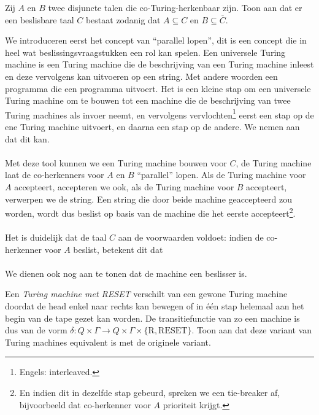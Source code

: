 \documentclass[a4paper]{article}
\begin{document}
\begin{question}
Zij $A$ en $B$ twee disjuncte talen die co-Turing-herkenbaar zijn. Toon aan dat er een beslisbare taal $C$ bestaat zodanig dat $A \subseteq C$ en $B \subseteq \overline{C}$.
\begin{answer}
We introduceren eerst het concept van ``parallel lopen'', dit is een concept die in heel wat beslissingsvraagstukken een rol kan spelen. Een universele Turing machine is een Turing machine die de beschrijving van een Turing machine inleest en deze vervolgens kan uitvoeren op een string. Met andere woorden een programma die een programma uitvoert. Het is een kleine stap om een universele Turing machine om te bouwen tot een machine die de beschrijving van twee Turing machines als invoer neemt, en vervolgens vervlochten\footnote{Engels: interleaved.} eerst een stap op de ene Turing machine uitvoert, en daarna een stap op de andere. We nemen aan dat dit kan.
\paragraph{}
Met deze tool kunnen we een Turing machine bouwen voor $C$, de Turing machine laat de co-herkenners voor $A$ en $B$ ``parallel'' lopen. Als de Turing machine voor $A$ accepteert, accepteren we ook, als de Turing machine voor $B$ accepteert, verwerpen we de string. Een string die door beide machine geaccepteerd zou worden, wordt dus beslist op basis van de machine die het eerste accepteert\footnote{En indien dit in dezelfde stap gebeurd, spreken we een tie-breaker af, bijvoorbeeld dat co-herkenner voor $A$ prioriteit krijgt.}.
\paragraph{}
Het is duidelijk dat de taal $C$ aan de voorwaarden voldoet: indien de co-herkenner voor $A$ beslist, betekent dit dat 
\paragraph{}
We dienen ook nog aan te tonen dat de machine een beslisser is.
\end{answer}
\end{question}

\begin{question}
Een \emph{Turing machine met RESET} verschilt van een gewone Turing machine doordat de head enkel naar rechts kan bewegen of in \'e\'en stap helemaal aan het begin van de tape gezet kan worden. De transitiefunctie van zo een machine is dus van de vorm $\delta : Q \times \Gamma \to Q \times \Gamma \times \{ \text{R}, \text{RESET} \}$. Toon aan dat deze variant van Turing machines equivalent is met de originele variant.
\begin{answer}

\end{answer}
\end{question}
\end{document}
